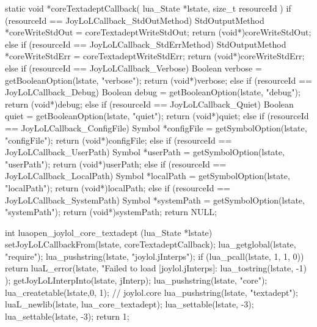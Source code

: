 static void *coreTextadeptCallback(
  lua_State *lstate,
  size_t resourceId
) {
  if (resourceId == JoyLoLCallback_StdOutMethod) {
    StdOutputMethod *coreWriteStdOut =
      coreTextadeptWriteStdOut;
    return (void*)coreWriteStdOut;
  } else if (resourceId == JoyLoLCallback_StdErrMethod) {
    StdOutputMethod *coreWriteStdErr =
      coreTextadeptWriteStdErr;
    return (void*)coreWriteStdErr;
  } else if (resourceId == JoyLoLCallback_Verbose) {
    Boolean verbose = getBooleanOption(lstate, "verbose");
    return (void*)verbose;
  } else if (resourceId == JoyLoLCallback_Debug) {
    Boolean debug = getBooleanOption(lstate, "debug");
    return (void*)debug;
  } else if (resourceId == JoyLoLCallback_Quiet) {
    Boolean quiet = getBooleanOption(lstate, "quiet");
    return (void*)quiet;
  } else if (resourceId == JoyLoLCallback_ConfigFile) {
    Symbol *configFile = getSymbolOption(lstate, "configFile");
    return (void*)configFile;
  } else if (resourceId == JoyLoLCallback_UserPath) {
    Symbol *userPath = getSymbolOption(lstate, "userPath");
    return (void*)userPath;
  } else if (resourceId == JoyLoLCallback_LocalPath) {
    Symbol *localPath = getSymbolOption(lstate, "localPath");
    return (void*)localPath;
  } else if (resourceId == JoyLoLCallback_SystemPath) {
    Symbol *systemPath = getSymbolOption(lstate, "systemPath");
    return (void*)systemPath;
  }
  return NULL;
} 

int luaopen_joylol_core_textadept (lua_State *lstate) {
  setJoyLoLCallbackFrom(lstate, coreTextadeptCallback);
  lua_getglobal(lstate, "require");
  lua_pushstring(lstate, "joylol.jInterps");
  if (lua_pcall(lstate, 1, 1, 0)) {
    return luaL_error(lstate,
      "Failed to load [joylol.jInterps]\nERROR:\n%
      lua_tostring(lstate, -1)
    );
  }
  getJoyLoLInterpInto(lstate, jInterp);
  lua_pushstring(lstate, "core");
  lua_createtable(lstate,0, 1); // joylol.core 
  lua_pushstring(lstate, "textadept");
  luaL_newlib(lstate, lua_core_textadept);
  lua_settable(lstate, -3);
  lua_settable(lstate, -3);
  return 1;
}
\stopCCode